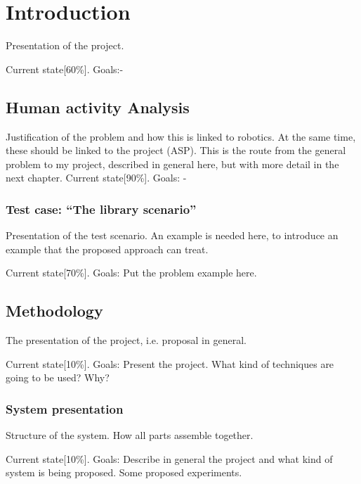 \documentclass[a4paper, 12pt, openany, oneside]{book}
\begin{document}
%


\newpage
\pagestyle{plain}
\chapter{Introduction}
Presentation of the project.

Current state[60\%].
Goals:-

\section{Human activity Analysis}
Justification of the problem and how this is linked to robotics.
At the same time, these should be linked to the project (ASP).
This is the route from the general problem to my project, described in general here, but with more detail in the next chapter.
Current state[90\%].
Goals: -


\subsection{Test case: ``The library scenario''}
Presentation of the test scenario.
An example is needed here, to introduce an example that the proposed approach can treat.

Current state[70\%].
Goals: Put the problem example here.


\section{Methodology}
The presentation of the project, i.e. proposal in general.

Current state[10\%].
Goals: Present the project. What kind of techniques are going to be used? Why?


\subsection{System presentation}
Structure of the system.
How all parts assemble together.

Current state[10\%].
Goals: Describe in general the project and what kind of system is being proposed. Some proposed experiments.
\end{document}
